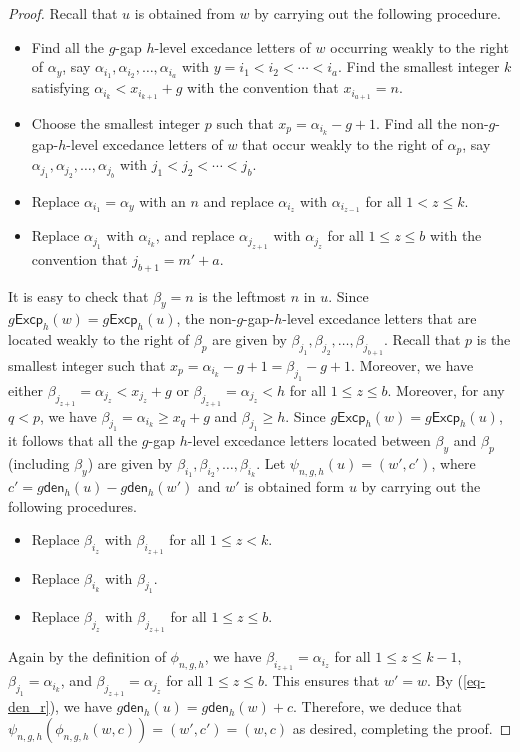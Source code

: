 \documentclass[12pt]{article}
\numberwithin{equation}{section}
\theoremstyle{plain}
\def\den{\mathsf{den}}
\def\Excp{\mathsf{Excp}}
\begin{document}
\begin{proof}
 	 Recall that   $u$ is obtained  from $w$ by carrying out  the following procedure.
 	\begin{itemize}
 	\item  Find all the $g$-gap $h$-level excedance letters   of $w$  occurring      weakly to the right of   $\alpha_y$,  say
 	$\alpha_{i_1}, \alpha_{i_2}, \ldots, \alpha_{i_a}$ with
 	$ y=i_1<i_2<\cdots <i_a$. Find the smallest  integer $k$ satisfying $\alpha_{i_k}< x_{i_{k+1}}+g$   with the convention that $x_{i_{a+1}}=n$.
 	\item    
 	Choose the smallest integer  $p$ such that $x_p=\alpha_{i_k}-g+1$.	Find all the  non-$g$-gap-$h$-level excedance letters of $w$ that occur   weakly   to  the right  of $\alpha_{p}$, say $\alpha_{j_1}, \alpha_{j_2}, \ldots, \alpha_{j_b}$ with $ j_1<j_2<\cdots<j_b$.    
 	\item   Replace  $\alpha_{i_1}=\alpha_y$ with an  $n$ and replace   $\alpha_{i_{z}}$  with $\alpha_{i_{z-1}}$  for all $1< z\leq k$. 
 	
 	\item  Replace  $\alpha_{j_1}$ with $\alpha_{i_k}$,  and  replace  $\alpha_{j_{z+1}}$ with $\alpha_{j_{z}}$ for all $1\leq z\leq b $  with the convention that $j_{b+1}=m'+a$.   
 \end{itemize}
 	It is easy to check that $\beta_{y}=n$ is the leftmost $n$ in $u$.  Since $g\Excp_h(w)=g\Excp_h(u)$,  the non-$g$-gap-$h$-level excedance letters that are located weakly to the  right of $\beta_p$ are given by $\beta_{j_1}, \beta_{j_2}, \ldots, \beta_{j_{b+1}}$.    Recall that $p$ is the smallest integer such that $x_p=\alpha_{i_k}-g+1=\beta_{j_1}-g+1$.  Moreover, we have  either $\beta_{j_{z+1}}=\alpha_{j_z}< x_{j_{z}}+g$ or $\beta_{j_{z+1}}=\alpha_{j_z}<h$ for all $1\leq z\leq b$.
 	Moreover, for any $q<p$, we have $\beta_{j_1}=\alpha_{i_k}\geq x_q+g$ and $\beta_{j_1}\geq h$.   Since $g\Excp_h(w)=g\Excp_h(u)$, it follows that   all the $g$-gap $h$-level excedance letters located between $\beta_{y}$ and $\beta_p$ (including $\beta_y$) are given by $\beta_{i_1}, \beta_{i_2}, \ldots, \beta_{i_k}$.  Let $\psi_{n,g,h}(u)=(w', c')$, where $c'=g\den_h(u)-g\den_h(w')$ and $w'$ is obtained form $u$ by carrying out the following procedures. 
 	 	\begin{itemize}
 	 	\item  Replace   $\beta_{i_{z}}$  with $\beta_{i_{z+1}}$  for all $1\leq z< k$.
 	 	\item Replace $\beta_{i_k}$ with $\beta_{j_1}$.
 	 	\item   Replace  $\beta_{j_{z}}$ with $\beta_{j_{z+1}}$ for all $1\leq z\leq b $. 
 	 \end{itemize}
 	Again by the definition of $\phi_{n,g,h}$, we have $\beta_{i_{z+1}}=\alpha_{i_z}$ for all $1\leq z\leq k-1$,  $\beta_{j_{1}}=\alpha_{i_k}$, and $\beta_{j_{z+1}}=\alpha_{j_z}$ for all $1\leq z\leq b$. This ensures that $w'=w$. 
 		By (\ref{eq-den_r}), we have $g\den_h(u)=g\den_h(w)+c$.  Therefore, we deduce that  $\psi_{n,g,h}(\phi_{n,g,h}(w, c))=(w', c')=(w, c)$ as desired, completing  the proof. 
  \end{proof}
\end{document}
